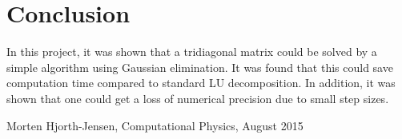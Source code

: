 \documentclass[12pt]{article}
\begin{document}
\section{Conclusion}
In this project, it was shown that a tridiagonal matrix could be solved by a simple algorithm using Gaussian elimination. It was found that this could save computation time compared to standard LU decomposition. In addition, it was shown that one could get a loss of numerical precision due to small step sizes. 











\begin{flushleft}

\begin{thebibliography}{}

\singlespacing
\small




  
  Morten Hjorth-Jensen,
  Computational Physics,
  August 2015
  
\end{thebibliography}
\end{flushleft}
\end{document}
